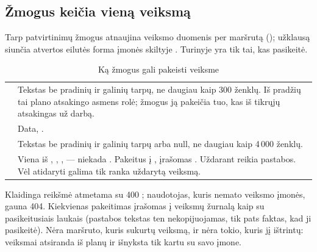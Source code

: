 \subsection{Žmogus keičia vieną veiksmą}

Tarp patvirtinimų žmogus atnaujina veiksmo duomenis per maršrutą
(); užklausą siunčia atvertos eilutės forma įmonės skiltyje .
Turinyje yra tik tai, kas pasikeitė.

\begin{table}[H]
\caption{Ką žmogus gali pakeisti veiksme}\label{tab:register:patch}
\begin{tabularx}{\textwidth}{@{}L{20mm}Y@{}}
\toprule
{} &  \\
\midrule
{} & Tekstas be pradinių ir galinių tarpų, ne daugiau kaip 300 ženklų. Iš pradžių tai
  plano atsakingo asmens rolė; žmogus ją pakeičia tuo, kas iš tikrųjų atsakingas už darbą. \\
 & Data, . \\
 & Tekstas be pradinių ir galinių tarpų arba null, ne daugiau kaip 4\,000 ženklų. \\
 & Viena iš , , ,  --- niekada
  . Pakeitus į , įrašomas . Uždarant reikia pastabos. Vėl
  atidaryti galima tik ranka uždarytą veiksmą. \\
\bottomrule
\end{tabularx}
\end{table}

Klaidinga reikšmė atmetama su 400 ; naudotojas, kuris nemato veiksmo įmonės,
gauna 404. Kiekvienas pakeitimas įrašomas į veiksmų žurnalą kaip  su
pasikeitusiais laukais (pastabos tekstas ten nekopijuojamas, tik pats faktas, kad ji pasikeitė).
Nėra maršruto, kuris sukurtų veiksmą, ir nėra tokio, kuris jį ištrintų: veiksmai atsiranda iš planų ir
išnyksta tik kartu su savo įmone.

